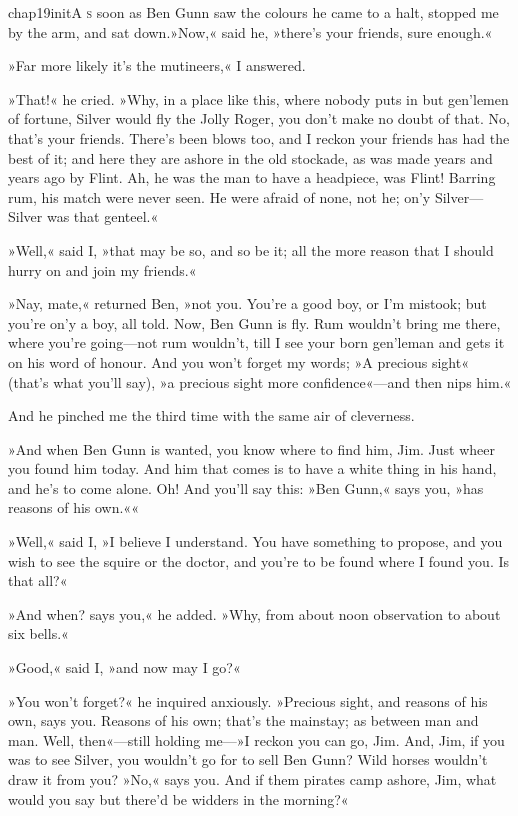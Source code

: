 
\lettrine[lines=5,image=true,findent=2pt]{chap19initA}{ s} soon as Ben Gunn saw the colours he came to a halt, stopped me by the arm, and sat down.»Now,« said he, »there's your friends, sure enough.« 

\zz
»Far more likely it's the mutineers,« I answered.
   
»That!« he cried. »Why, in a place like this, where nobody puts in but gen'lemen of fortune, Silver would fly the Jolly Roger, you don't make no doubt of that. No, that's your friends. There's been blows too, and I reckon your friends has had the best of it; and here they are ashore in the old stockade, as was made years and years ago by Flint. Ah, he was the man to have a headpiece, was Flint! Barring rum, his match were never seen. He were afraid of none, not he; on'y Silver—Silver was that genteel.«

»Well,« said I, »that may be so, and so be it; all the more reason that I should hurry on and join my friends.«

»Nay, mate,« returned Ben, »not you. You're a good boy, or I'm mistook; but you're on'y a boy, all told. Now, Ben Gunn is fly. Rum wouldn't bring me there, where you're going—not rum wouldn't, till I see your born gen'leman and gets it on his word of honour. And you won't forget my words; »A precious sight« (that's what you'll say), »a precious sight more confidence«—and then nips him.«

And he pinched me the third time with the same air of cleverness.

»And when Ben Gunn is wanted, you know where to find him, Jim. Just wheer you found him today. And him that comes is to have a white thing in his hand, and he's to come alone. Oh! And you'll say this: »Ben Gunn,« says you, »has reasons of his own.««

»Well,« said I, »I believe I understand. You have something to propose, and you wish to see the squire or the doctor, and you're to be found where I found you. Is that all?«

»And when? says you,« he added. »Why, from about noon observation to about six bells.«

»Good,« said I, »and now may I go?«

»You won't forget?« he inquired anxiously. »Precious sight, and reasons of his own, says you. Reasons of his own; that's the mainstay; as between man and man. Well, then«—still holding me—»I reckon you can go, Jim. And, Jim, if you was to see Silver, you wouldn't go for to sell Ben Gunn? Wild horses wouldn't draw it from you? »No,« says you. And if them pirates camp ashore, Jim, what would you say but there'd be widders in the morning?«

